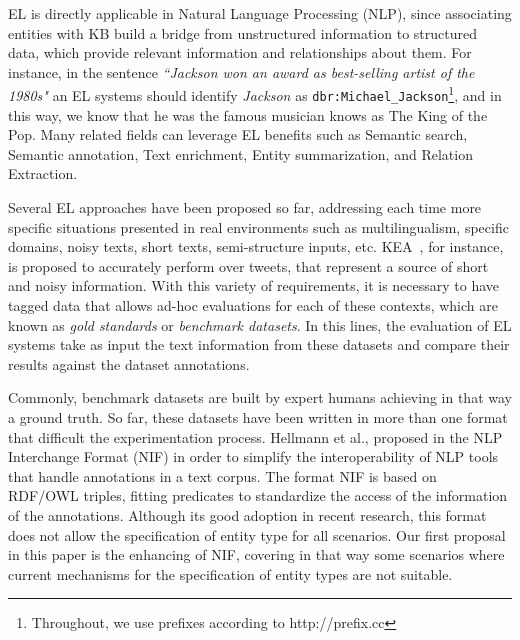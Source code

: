 \documentclass{llncs}
\begin{document}
EL is directly applicable in Natural Language Processing (NLP), since associating entities with KB build a bridge from unstructured information to structured data, which provide relevant information and relationships about them. For instance, in the sentence \textit{``Jackson won an award as best-selling artist of the 1980s"} an EL systems should identify \textit{Jackson} as \texttt{dbr:Michael\_Jackson}\footnote{Throughout, we use prefixes according to http://prefix.cc}, and in this way, we know that he was the famous musician knows as The King of the Pop. Many related fields can leverage EL benefits such as Semantic search, Semantic annotation, Text enrichment, Entity summarization, and Relation Extraction. 

Several EL approaches have been proposed so far, addressing each time more specific situations presented in real environments such as multilingualism, specific domains, noisy texts, short texts, semi-structure inputs, etc. KEA~\cite{KEA2016}, for instance, is proposed to accurately perform over tweets, that represent a source of short and noisy information. With this variety of requirements, it is necessary to have tagged data that allows ad-hoc evaluations for each of these contexts, which are known as \textit{gold standards} or \textit{benchmark datasets}. In this lines, the evaluation of EL systems take as input the text information from these datasets and compare their results against the dataset annotations. 

Commonly, benchmark datasets are built by expert humans achieving in that way a ground truth. So far, these datasets have been written in more than one format that difficult the experimentation process. Hellmann et al., proposed in \cite{NIFpaper} the NLP Interchange Format (NIF) in order to simplify the interoperability of NLP tools that handle annotations in a text corpus. The format NIF is based on RDF/OWL triples, fitting predicates to standardize the access of the information of the annotations. Although its good adoption in recent research, this format does not allow the specification of entity type for all scenarios. Our first proposal in this paper is the enhancing of NIF, covering in that way some scenarios where current mechanisms for the specification of entity types are not suitable.
\end{document}
